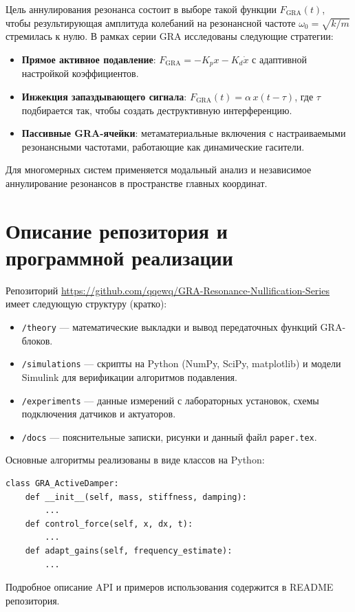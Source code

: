 \documentclass[a4paper,12pt]{article}
\begin{document}
Цель аннулирования резонанса состоит в выборе такой функции $F_{\text{GRA}}(t)$, чтобы результирующая амплитуда колебаний на резонансной частоте $\omega_0 = \sqrt{k/m}$ стремилась к нулю. В рамках серии GRA исследованы следующие стратегии:
\begin{itemize}
    \item \textbf{Прямое активное подавление}: $F_{\text{GRA}} = -K_p x - K_d \dot{x}$ с адаптивной настройкой коэффициентов.
    \item \textbf{Инжекция запаздывающего сигнала}: $F_{\text{GRA}}(t) = \alpha \, x(t-\tau)$, где $\tau$ подбирается так, чтобы создать деструктивную интерференцию.
    \item \textbf{Пассивные GRA-ячейки}: метаматериальные включения с настраиваемыми резонансными частотами, работающие как динамические гасители.
\end{itemize}

Для многомерных систем применяется модальный анализ и независимое аннулирование резонансов в пространстве главных координат.

\section{Описание репозитория и программной реализации}
Репозиторий \url{https://github.com/qqewq/GRA-Resonance-Nullification-Series} имеет следующую структуру (кратко):

\begin{itemize}
    \item \texttt{/theory} — математические выкладки и вывод передаточных функций GRA-блоков.
    \item \texttt{/simulations} — скрипты на Python (NumPy, SciPy, matplotlib) и модели Simulink для верификации алгоритмов подавления.
    \item \texttt{/experiments} — данные измерений с лабораторных установок, схемы подключения датчиков и актуаторов.
    \item \texttt{/docs} — пояснительные записки, рисунки и данный файл \texttt{paper.tex}.
\end{itemize}

Основные алгоритмы реализованы в виде классов на Python:
\begin{verbatim}
class GRA_ActiveDamper:
    def __init__(self, mass, stiffness, damping):
        ...
    def control_force(self, x, dx, t):
        ...
    def adapt_gains(self, frequency_estimate):
        ...
\end{verbatim}
Подробное описание API и примеров использования содержится в README репозитория.
\end{document}
